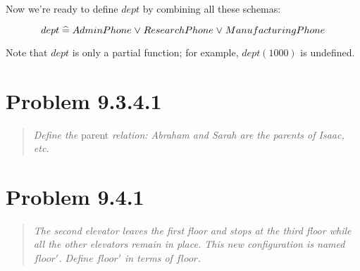 \documentclass[10pt]{article}
\begin{document}
Now we're ready to define $dept$ by combining all these schemas:

\[ dept \mathrel{\widehat=} AdminPhone \mathrel{\vee} ResearchPhone \mathrel{\vee} ManufacturingPhone \]

Note that $dept$ is only a partial function; for example, $dept(1000)$ is undefined.


\section{Problem 9.3.4.1}
\begin{quote}
  {\it Define the} parent {\it relation: Abraham and Sarah are the parents of Isaac, etc.}

\end{quote}

\section{Problem 9.4.1}
\begin{quote}
  {\it The second elevator leaves the first floor and stops at the third floor while all the other
    elevators remain in place.  This new configuration is named $floor'$.  Define $floor'$ in terms
    of $floor$.}

\end{quote}
\end{document}
